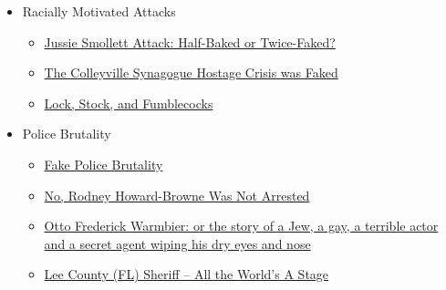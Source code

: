 \documentclass{article}
\newcommand{\insertmydocument}[2]{ %
  \item \href{http://www.mileswmathis.com/#2}{#1}
}
\begin{document}
\begin{itemize}
\begin{itemize}
    \item Racially Motivated Attacks
    \begin{itemize}

      \insertmydocument{Jussie Smollett Attack: Half-Baked or Twice-Faked?}{smallit.pdf}
      \insertmydocument{The Colleyville Synagogue Hostage Crisis was Faked}{colley.pdf}
      \insertmydocument{Lock, Stock, and Fumblecocks}{dmitri.pdf}
    \end{itemize}

    \item Police Brutality
    \begin{itemize}

      \insertmydocument{Fake Police Brutality}{police.pdf}
      \insertmydocument{No, Rodney Howard-Browne Was Not Arrested}{rodney.pdf}
      \insertmydocument{Otto Frederick Warmbier: or the story of a Jew, a gay, a terrible actor and a secret agent wiping his dry eyes and nose}{ow.pdf}
      \insertmydocument{Lee County (FL) Sheriff – All the World’s A Stage}{leecounty.pdf}
    \end{itemize}
  \end{itemize}
\end{itemize}
\end{document}

